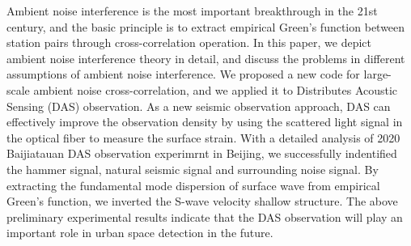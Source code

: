\begin{abstract*}
  Ambient noise interference is the most important breakthrough in the 21st century, and the basic principle is to extract empirical Green's function between station pairs through cross-correlation operation.
  In this paper, we depict ambient noise interference theory in detail, and discuss the problems in different assumptions of ambient noise interference. 
  We proposed a new code for large-scale ambient noise cross-correlation, and we applied it to Distributes Acoustic Sensing (DAS) observation.
  As a new seismic observation approach, DAS can effectively improve the observation density by using the scattered light signal in the optical fiber to measure the surface strain.
With a detailed analysis of 2020 Baijiatauan DAS observation experimrnt in Beijing, we successfully indentified the hammer signal, natural seismic signal and surrounding noise signal.
By extracting the fundamental mode  dispersion of surface wave from empirical Green's function, we inverted the S-wave velocity shallow structure.
The above preliminary experimental results indicate that the DAS observation will play an important role in urban space detection in the future.





\end{abstract*}
